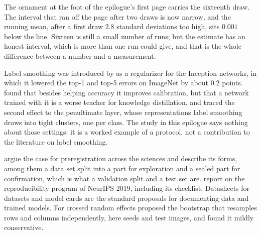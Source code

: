 \begin{refsection}
The ornament at the foot of the epilogue's first page carries the sixteenth draw. The interval that ran off the page after two draws is now narrow, and the running mean, after a first draw $2.8$ standard deviations too high, sits $0.001$ below the line. Sixteen is still a small number of runs; but the estimate has an honest interval, which is more than one run could give, and that is the whole difference between a number and a measurement.

\notesandrefs

Label smoothing was introduced by \textcite{SzegedyEtAl2016} as a regularizer for the Inception networks, in which it lowered the top-1 and top-5 errors on ImageNet by about $0.2$ points. \Textcite{MullerKornblithHinton2019} found that besides helping accuracy it improves calibration, but that a network trained with it is a worse teacher for knowledge distillation, and traced the second effect to the penultimate layer, whose representations label smoothing draws into tight clusters, one per class. The study in this epilogue says nothing about those settings: it is a worked example of a protocol, not a contribution to the literature on label smoothing.

\textcite{NosekEtAl2018} argue the case for preregistration across the sciences and describe its forms, among them a data set split into a part for exploration and a sealed part for confirmation, which is what a validation split and a test set are. \textcite{PineauEtAl2021} report on the reproducibility program of NeurIPS 2019, including its checklist. Datasheets for datasets \parencite{GebruEtAl2021} and model cards \parencite{MitchellEtAl2019} are the standard proposals for documenting data and trained models. For crossed random effects \textcite{Owen2007} proposed the bootstrap that resamples rows and columns independently, here seeds and test images, and found it mildly conservative.

\printchapterbib
\end{refsection}
\labfloatrestore

